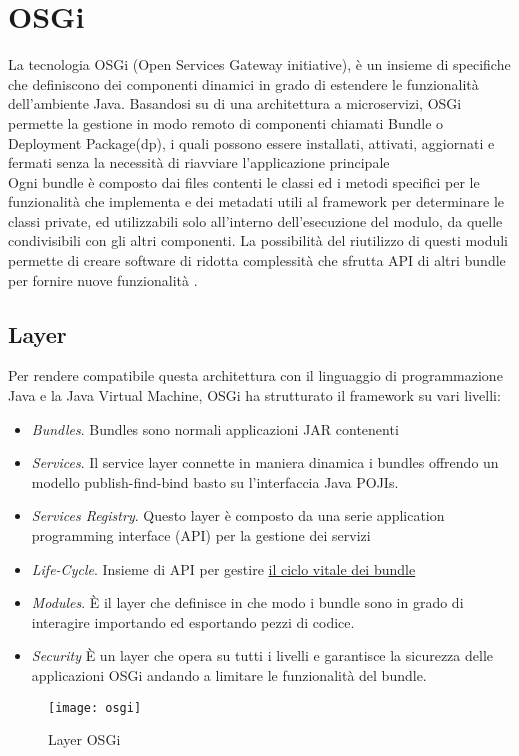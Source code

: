 \section{OSGi}
La tecnologia OSGi (Open Services Gateway initiative),
è un insieme di specifiche che definiscono dei componenti
dinamici in grado di estendere le funzionalità dell'ambiente  Java.
Basandosi su di una architettura a microservizi, OSGi permette la gestione in
modo remoto di componenti chiamati Bundle o Deployment Package(dp), i quali
possono essere installati, attivati, aggiornati e fermati senza la necessità di
riavviare l'applicazione principale\\
Ogni bundle è composto dai files contenti le classi ed i metodi specifici per le
funzionalità che implementa e dei metadati utili al framework
 per determinare le classi private, ed utilizzabili solo all'interno
dell'esecuzione del modulo, da quelle condivisibili con gli altri componenti. 
La possibilità del riutilizzo di questi moduli permette di
creare software di ridotta complessità che sfrutta API di altri bundle
per fornire nuove funzionalità .
\subsection{Layer}
Per rendere compatibile questa architettura con il linguaggio di programmazione
Java e la Java Virtual Machine, OSGi ha strutturato il framework su vari
livelli:
\begin{itemize}
        \item   \textit{Bundles}. Bundles sono normali applicazioni JAR contenenti
        \item   \textit{Services}. Il service layer connette in maniera dinamica
                i bundles offrendo un modello publish-find-bind basto su
                l'interfaccia Java POJIs.
        \item   \textit{Services Registry}. Questo layer è composto da una serie
                application programming interface (API) per la gestione dei
                servizi
        \item   \textit{Life-Cycle}. Insieme di API per gestire \hyperlink{cycle_bundle}{il ciclo vitale
                dei bundle}
        \item   \textit{Modules}. È il layer che definisce in che modo i bundle
                sono in grado di interagire importando ed esportando pezzi di
                codice.
        \item   \textit{Security} È un layer che opera su tutti i livelli e
                garantisce la sicurezza delle applicazioni OSGi andando a
                limitare le funzionalità del bundle.
\end{itemize}
\begin{figure}[h]
\centering 
\texttt{[image: osgi]}
\caption{Layer OSGi}
\label{}
\end{figure}

